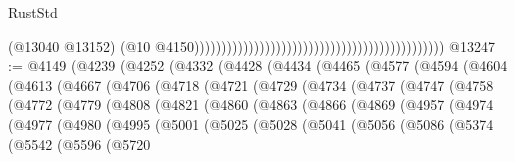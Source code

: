\begin{lexlean}{RustStd}
\begin{coremodule}
                                                                                              (@13040
                                                                                                @13152)
                                                                                              (@10
                                                                                                @4150))))))))))))))))))))))))))))))))))))))))))))))
@13247 := @4149
    (@4239
      (@4252
        (@4332
          (@4428
            (@4434
              (@4465
                (@4577
                  (@4594
                    (@4604
                      (@4613
                        (@4667
                          (@4706
                            (@4718
                              (@4721
                                (@4729
                                  (@4734
                                    (@4737
                                      (@4747
                                        (@4758
                                          (@4772
                                            (@4779
                                              (@4808
                                                (@4821
                                                  (@4860
                                                    (@4863
                                                      (@4866
                                                        (@4869
                                                          (@4957
                                                            (@4974
                                                              (@4977
                                                                (@4980
                                                                  (@4995
                                                                    (@5001
                                                                      (@5025
                                                                        (@5028
                                                                          (@5041
                                                                            (@5056
                                                                              (@5086
                                                                                (@5374
                                                                                  (@5542
                                                                                    (@5596
                                                                                      (@5720

\end{coremodule}
\end{lexlean}

